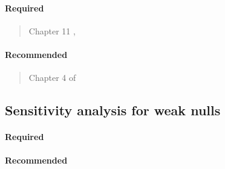 \documentclass[12pt]{article}
\begin{document}
\paragraph*{Required}

\begin{verse}
  Chapter 11 , 
\end{verse}

\paragraph*{Recommended}

\begin{verse} Chapter 4 of  \end{verse}

\begin{verse}  \end{verse}

\begin{verse}  \end{verse}

\begin{verse}  \end{verse}

\begin{verse}  \end{verse}

\subsection{Sensitivity analysis for weak nulls}

\paragraph*{Required}

\begin{verse}  \end{verse}

\paragraph*{Recommended}

\begin{verse}  \end{verse}

\begin{verse}  \end{verse}
\end{document}
